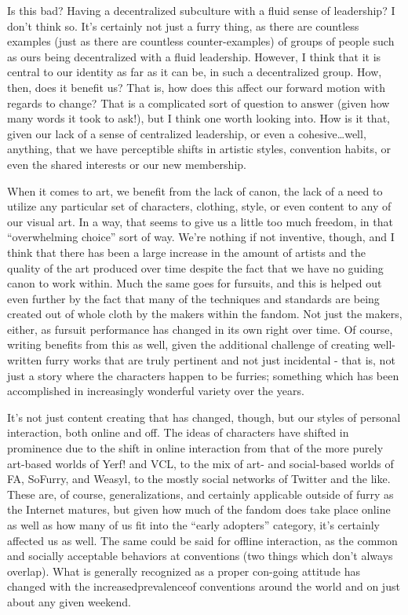 Is this bad? Having a decentralized subculture with a fluid sense of leadership? I don't think so. It's certainly not just a furry thing, as there are countless examples (just as there are countless counter-examples) of groups of people such as ours being decentralized with a fluid leadership. However, I think that it is central to our identity as far as it can be, in such a decentralized group. How, then, does it benefit us? That is, how does this affect our forward motion with regards to change? That is a complicated sort of question to answer (given how many words it took to ask!), but I think one worth looking into. How is it that, given our lack of a sense of centralized leadership, or even a cohesive\ldots{}well, anything, that we have perceptible shifts in artistic styles, convention habits, or even the shared interests or our new membership.

When it comes to art, we benefit from the lack of canon, the lack of a need to utilize any particular set of characters, clothing, style, or even content to any of our visual art. In a way, that seems to give us a little too much freedom, in that ``overwhelming choice'' sort of way. We're nothing if not inventive, though, and I think that there has been a large increase in the amount of artists and the quality of the art produced over time despite the fact that we have no guiding canon to work within. Much the same goes for fursuits, and this is helped out even further by the fact that many of the techniques and standards are being created out of whole cloth by the makers within the fandom. Not just the makers, either, as fursuit performance has changed in its own right over time. Of course, writing benefits from this as well, given the additional challenge of creating well-written furry works that are truly pertinent and not just incidental - that is, not just a story where the characters happen to be furries; something which has been accomplished in increasingly wonderful variety over the years.

It's not just content creating that has changed, though, but our styles of personal interaction, both online and off. The ideas of characters have shifted in prominence due to the shift in online interaction from that of the more purely art-based worlds of Yerf! and VCL, to the mix of art- and social-based worlds of FA, SoFurry, and Weasyl, to the mostly social networks of Twitter and the like. These are, of course, generalizations, and certainly applicable outside of furry as the Internet matures, but given how much of the fandom does take place online as well as how many of us fit into the ``early adopters'' category, it's certainly affected us as well. The same could be said for offline interaction, as the common and socially acceptable behaviors at conventions (two things which don't always overlap). What is generally recognized as a proper con-going attitude has changed with the increasedprevalenceof conventions around the world and on just about any given weekend.

